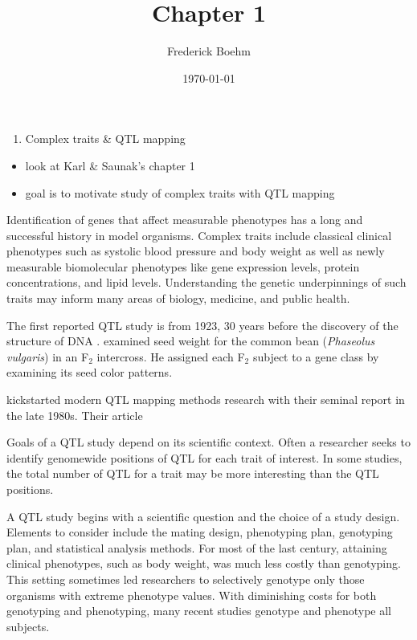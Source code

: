 \documentclass[]{article}
\title{Chapter 1}
\author{Frederick Boehm}
\date{\today}
\providecommand{\tightlist}{%
  \setlength{\itemsep}{0pt}\setlength{\parskip}{0pt}}
\begin{document}
\doublespacing
\maketitle

\listoftodos
\listoffigures
\listoftables


\begin{enumerate}
\def\labelenumi{\arabic{enumi}.}
\tightlist
\item
  Complex traits \& QTL mapping
\end{enumerate}

\begin{itemize}
\tightlist
\item
  look at Karl \& Saunak's chapter 1
\item
  goal is to motivate study of complex traits with QTL mapping
\end{itemize}

Identification of genes that affect measurable phenotypes has a long and
successful history in model organisms. Complex traits include classical
clinical phenotypes such as systolic blood pressure and body weight as
well as newly measurable biomolecular phenotypes like gene expression
levels, protein concentrations, and lipid levels. Understanding the
genetic underpinnings of such traits may inform many areas of biology,
medicine, and public health.

The first reported QTL study is from 1923, 30 years before the discovery of the structure of DNA \citep{watson1953molecular}. \citet{sax1923association} examined seed weight for the common bean (\emph{Phaseolus vulgaris}) in an F\(_2\) intercross. He assigned each F\(_2\) subject to a gene class by examining its seed color patterns.

\citet{lander1989mapping} kickstarted modern QTL mapping methods research with their seminal report in the late 1980s. Their article

Goals of a QTL study depend on its scientific context. Often a
researcher seeks to identify genomewide positions of QTL for each trait
of interest. In some studies, the total number of QTL for a trait may be
more interesting than the QTL positions.

A QTL study begins with a scientific question and the choice of a study
design. Elements to consider include the mating design, phenotyping
plan, genotyping plan, and statistical analysis methods. For most of the
last century, attaining clinical phenotypes, such as body weight, was
much less costly than genotyping. This setting sometimes led researchers
to selectively genotype only those organisms with extreme phenotype
values. With diminishing costs for both genotyping and phenotyping, many
recent studies genotype and phenotype all subjects.
\end{document}
